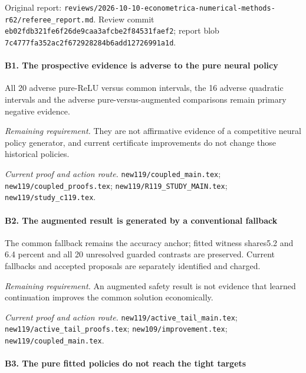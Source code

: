 Original report: \nolinkurl{reviews/2026-10-10-econometrica-numerical-methods-r62/referee_report.md}. Review commit \nolinkurl{eb02fdb321fe6f26de9caa3afcbe2f84531faef2}; report blob \nolinkurl{7c4777fa352ac2f672928284b6add12726991a1d}.

\paragraph{B1. The prospective evidence is adverse to the pure neural policy}

All 20 adverse pure-ReLU versus common intervals, the 16 adverse quadratic intervals and the adverse pure-versus-augmented comparisons remain primary negative evidence.

\par\emph{Remaining requirement.} They are not affirmative evidence of a competitive neural policy generator, and current certificate improvements do not change those historical policies.

\par\emph{Current proof and action route.} \nolinkurl{new119/coupled_main.tex}; \nolinkurl{new119/coupled_proofs.tex}; \nolinkurl{new119/R119_STUDY_MAIN.tex}; \nolinkurl{new119/study_c119.tex}.

\paragraph{B2. The augmented result is generated by a conventional fallback}

The common fallback remains the accuracy anchor; fitted witness shares5.2 and 6.4 percent and all 20 unresolved guarded contrasts are preserved. Current fallbacks and accepted proposals are separately identified and charged.

\par\emph{Remaining requirement.} An augmented safety result is not evidence that learned continuation improves the common solution economically.

\par\emph{Current proof and action route.} \nolinkurl{new119/active_tail_main.tex}; \nolinkurl{new119/active_tail_proofs.tex}; \nolinkurl{new109/improvement.tex}; \nolinkurl{new119/coupled_main.tex}.

\paragraph{B3. The pure fitted policies do not reach the tight targets}


